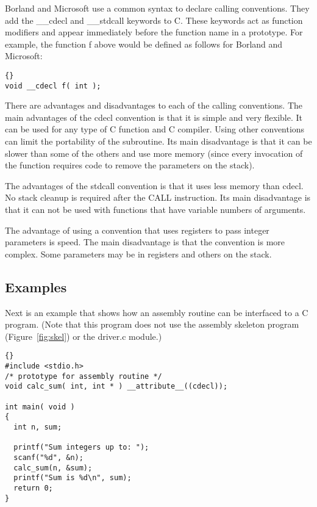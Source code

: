 Borland and Microsoft use a common syntax to declare calling
conventions.  They add the {\code \_\_cdecl} and {\code \_\_stdcall} keywords to C. These keywords act as function
modifiers and appear immediately before the function name in a
prototype. For example, the function {\code f} above would be defined
as follows for Borland and Microsoft:
\begin{lstlisting}[stepnumber=0]{}
void __cdecl f( int );
\end{lstlisting}

There are advantages and disadvantages to each of the calling
conventions.  The main advantages of the {\code cdecl} convention is that it is simple and very flexible. It
can be used for any type of C function and C compiler. Using other
conventions can limit the portability of the subroutine. Its main
disadvantage is that it can be slower than some of the others and use
more memory (since every invocation of the function requires code to
remove the parameters on the stack).

The advantages of the {\code stdcall} convention is that it uses less memory than
{\code cdecl}. No stack cleanup is required after the {\code CALL}
instruction. Its main disadvantage is that it can not be used with
functions that have variable numbers of arguments.

The advantage of using a convention that uses registers to pass integer
parameters is speed. The main disadvantage is that the convention is more
complex. Some parameters may be in registers and others on the stack.


\subsection{Examples}

Next is an example that shows how an assembly routine can be interfaced to
a C program. (Note that this program does not use the assembly skeleton
program (Figure~\ref{fig:skel}) or the driver.c module.)

\begin{lstlisting}{}
#include <stdio.h>
/* prototype for assembly routine */
void calc_sum( int, int * ) __attribute__((cdecl));

int main( void )
{
  int n, sum;

  printf("Sum integers up to: ");
  scanf("%d", &n);
  calc_sum(n, &sum);
  printf("Sum is %d\n", sum);
  return 0;
}
\end{lstlisting}

